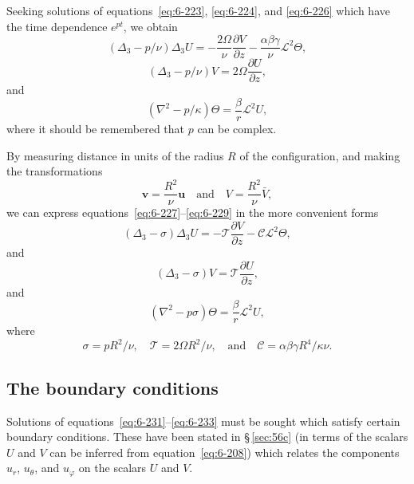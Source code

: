 Seeking solutions of equations~\eqref{eq:6-223}, \eqref{eq:6-224}, and \eqref{eq:6-226} which have the
time dependence $e^{pt}$, we obtain
\begin{equation}\label{eq:6-227}
(\Delta_3 - p/\nu)\Delta_3 U = -\frac{2\Omega}{\nu}\frac{\partial V}{\partial z} - \frac{\alpha\beta\gamma}{\nu}\mathscr{L}^2\Theta,
\end{equation}
\begin{equation}\label{eq:6-228}
(\Delta_3 - p/\nu)V = 2\Omega\frac{\partial U}{\partial z},
\end{equation}
and
\begin{equation}\label{eq:6-229}
(\nabla^2 - p/\kappa)\Theta = \frac{\beta}{r}\mathscr{L}^2 U,
\end{equation}
where it should be remembered that $p$ can be complex.

By measuring distance in units of the radius $R$ of the configuration,
and making the transformations
\begin{equation}\label{eq:6-230}
\boldsymbol{v} = \frac{R^2}{\nu}\boldsymbol{u}\quad\text{and}\quad V = \frac{R^2}{\nu}\bar{V},
\end{equation}
we can express equations~\eqref{eq:6-227}--\eqref{eq:6-229} in the more convenient forms
\begin{equation}\label{eq:6-231}
(\Delta_3 - \sigma)\Delta_3 U = -\mathscr{T}\frac{\partial V}{\partial z} - \mathcal{C}\mathscr{L}^2\Theta,
\end{equation}
and
\begin{equation}\label{eq:6-232}
(\Delta_3 - \sigma)V = \mathscr{T}\frac{\partial U}{\partial z},
\end{equation}
and
\begin{equation}\label{eq:6-233}
(\nabla^2 - p\sigma)\Theta = \frac{\beta}{r}\mathscr{L}^2 U,
\end{equation}
where
\begin{equation}\label{eq:6-234}
\sigma = pR^2/\nu,\quad \mathscr{T} = 2\Omega R^2/\nu,\quad\text{and}\quad \mathcal{C} = \alpha\beta\gamma R^4/\kappa\nu.
\end{equation}

\subsection{The boundary conditions}\label{sec:61c}
Solutions of equations~\eqref{eq:6-231}--\eqref{eq:6-233} must be sought which satisfy
certain boundary conditions. These have been stated in \S\,\ref{sec:56c} (in terms
of the scalars $U$ and $V$ can be inferred from equation~\eqref{eq:6-208}) which
relates the components $u_r$, $u_\theta$, and $u_\varphi$ on the scalars $U$ and $V$.

